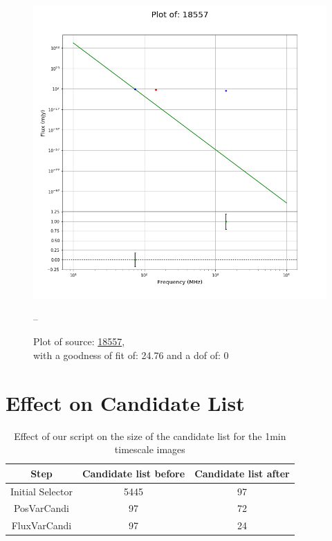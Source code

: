 \documentclass{article}
\begin{document}
\begin{figure}[H]
    \centering
    \begin{minipage}{.5\textwidth}
        \centering
        \includegraphics[scale = 0.35]{KmeulenTrap4P23_1min/1min18557.png}
        \captionsetup{labelformat=empty}
        \caption{Plot of source: \href{http://banana.transientskp.org/r4/vlo_KmeulenTrap4P23/runningcatalog/18557}{18557},\\with a goodness of fit of: 24.76 and a dof of: 0}
        \addtocounter{figure}{-1}
        \label{KmeulenTrap4P23:1min:18557:plot}
    \end{minipage}%
    \begin{minipage}{0.5\textwidth}
        \centering

--
        \end{minipage}
\end{figure}
\section{Effect on Candidate List}
\begin{table}[H]
    \centering
    \begin{tabular}{|c| c | c|}
    \toprule
     Step & Candidate list before & Candidate list after\\
    \midrule
        Initial Selector & 5445 & 97 \\
        PosVarCandi & 97 & 72 \\
        FluxVarCandi & 97 & 24  \\
        \midrule
    \end{tabular}
    \caption{Effect of our script on the size of the candidate list for the 1min timescale images}
    \label{KmeulenTrap4P23:1min:overviewcandidates}
\end{table}
\end{document}
